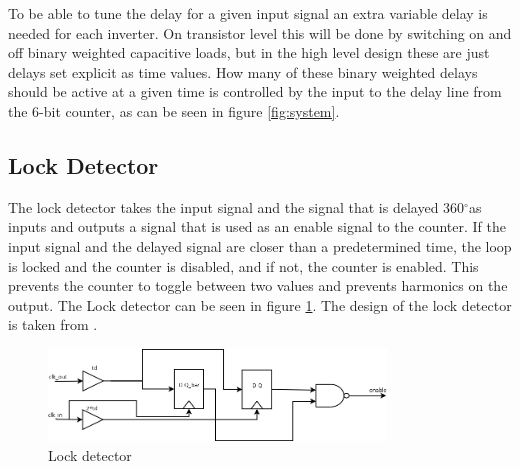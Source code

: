 \documentclass[a4paper,12pt]{article} \usepackage{graphicx}
\newcommand{\degree}{\ensuremath{^\circ}}
\begin{document}
To be able to tune the delay for a given input signal an extra
variable delay is needed for each inverter. On transistor level this
will be done by switching on and off binary weighted capacitive loads,
but in the high level design these are just delays set explicit as time
values. How many of these binary weighted delays should be active at a
given time is controlled by the input to the delay line from the 6-bit
counter, as can be seen in figure \ref{fig:system}. 


\subsection{Lock Detector}
The lock detector takes the input signal and the signal that is delayed 
360\degree  as inputs and outputs a signal that is used as an enable 
signal to the counter. If the input signal and the delayed signal are 
closer than a predetermined time, the loop is locked and the counter
is disabled, and if not, the counter is enabled. This prevents 
the counter to toggle between two values and prevents harmonics on the
output. The Lock detector can be seen in figure \ref{fig:lockdetect}.
The design of the lock detector is taken from \cite{lock_detect}.

\begin{figure}[h!]
        \centering
        \includegraphics[width=0.8\textwidth]{../Bilder/lock_detector_block.png}
        \caption{Lock detector}
        \label{fig:lockdetect}
\end{figure}
\end{document}
